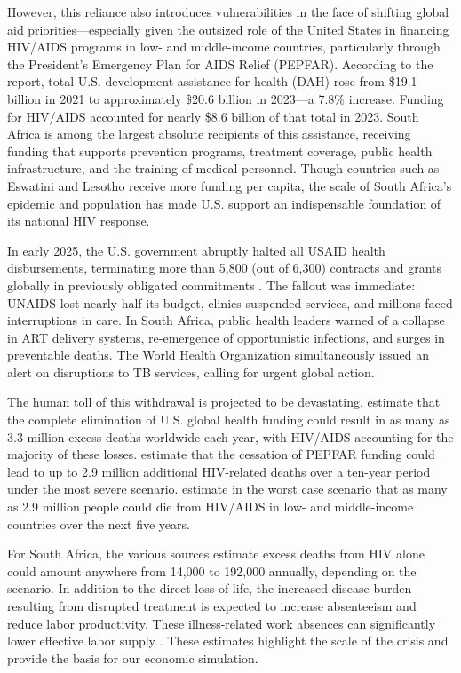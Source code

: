\documentclass[letterpaper,12pt]{article}
\theoremstyle{definition}
\begin{document}
\begin{spacing}{1.5}
However, this reliance also introduces vulnerabilities in the face of shifting global aid priorities—especially given the outsized role of the United States in financing HIV/AIDS programs in low- and middle-income countries, particularly through the President’s Emergency Plan for AIDS Relief (PEPFAR). According to the \citet{FGH2023} report, total U.S. development assistance for health (DAH) rose from \$19.1 billion in 2021 to approximately \$20.6 billion in 2023—a 7.8\% increase. Funding for HIV/AIDS accounted for nearly \$8.6 billion of that total in 2023. South Africa is among the largest absolute recipients of this assistance, receiving funding that supports prevention programs, treatment coverage, public health infrastructure, and the training of medical personnel. Though countries such as Eswatini and Lesotho receive more funding per capita, the scale of South Africa’s epidemic and population has made U.S. support an indispensable foundation of its national HIV response.

In early 2025, the U.S. government abruptly halted all USAID health disbursements, terminating more than 5,800 (out of 6,300) contracts and grants globally in previously obligated commitments \citep{Cohen2025}. The fallout was immediate: UNAIDS lost nearly half its budget, clinics suspended services, and millions faced interruptions in care. In South Africa, public health leaders warned of a collapse in ART delivery systems, re-emergence of opportunistic infections, and surges in preventable deaths. The World Health Organization simultaneously issued an alert on disruptions to TB services, calling for urgent global action.

The human toll of this withdrawal is projected to be devastating. \citet{KS2025} estimate that the complete elimination of U.S. global health funding could result in as many as 3.3 million excess deaths worldwide each year, with HIV/AIDS accounting for the majority of these losses. \citet{Gandhi2025} estimate that the cessation of PEPFAR funding could lead to up to 2.9 million additional HIV-related deaths over a ten-year period under the most severe scenario.  estimate in the worst case scenario that as many as 2.9 million people could die from HIV/AIDS in low- and middle-income countries over the next five years.

For South Africa, the various sources estimate excess deaths from HIV alone could amount anywhere from 14,000 to 192,000 annually, depending on the scenario. In addition to the direct loss of life, the increased disease burden resulting from disrupted treatment is expected to increase absenteeism and reduce labor productivity. These illness-related work absences can significantly lower effective labor supply \citep{Keogh2024,Panda2024}. These estimates highlight the scale of the crisis and provide the basis for our economic simulation.


\end{spacing}
\end{document}
